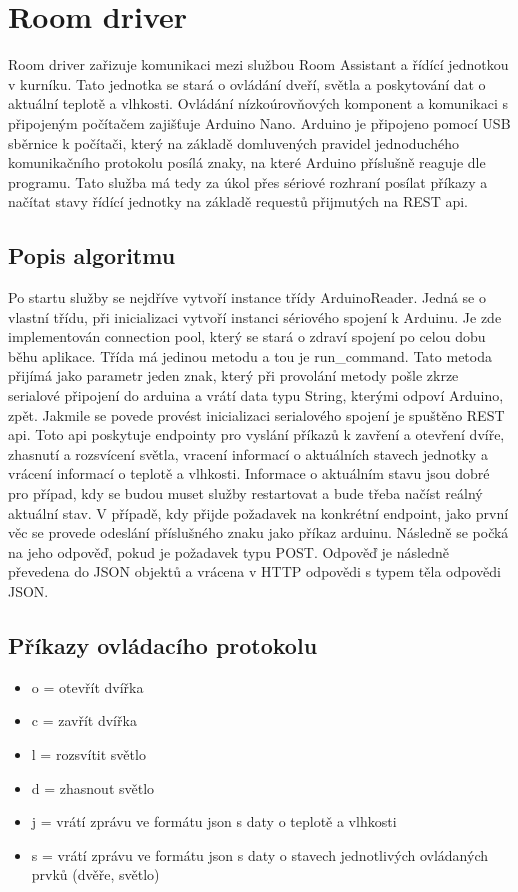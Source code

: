 \section{Room driver}\label{sec:room-driver}
Room driver zařizuje komunikaci mezi službou Room Assistant a řídící jednotkou v kurníku.
Tato jednotka se stará o ovládání dveří, světla a poskytování dat o aktuální teplotě a vlhkosti.
Ovládání nízkoúrovňových komponent a komunikaci s připojeným počítačem zajišťuje Arduino Nano.
Arduino je připojeno pomocí USB sběrnice k počítači, který na základě domluvených pravidel jednoduchého komunikačního protokolu posílá znaky, na které Arduino příslušně reaguje dle programu.
Tato služba má tedy za úkol přes sériové rozhraní posílat příkazy a načítat stavy řídící jednotky na základě requestů přijmutých na REST api.

\subsection*{Popis algoritmu}
Po startu služby se nejdříve vytvoří instance třídy ArduinoReader.
Jedná se o vlastní třídu, při inicializaci vytvoří instanci sériového spojení k Arduinu.
Je zde implementován connection pool, který se stará o zdraví spojení po celou dobu běhu aplikace.
Třída má jedinou metodu a tou je run\_command.
Tato metoda přijímá jako parametr jeden znak, který při provolání metody pošle zkrze serialové připojení do arduina a vrátí data typu String, kterými odpoví Arduino, zpět.
Jakmile se povede provést inicializaci serialového spojení je spuštěno REST api.
Toto api poskytuje endpointy pro vyslání příkazů k zavření a otevření dvíře, zhasnutí a rozsvícení světla, vracení informací o aktuálních stavech jednotky a vrácení informací o teplotě a vlhkosti.
Informace o aktuálním stavu jsou dobré pro případ, kdy se budou muset služby restartovat a bude třeba načíst reálný aktuální stav.
V případě, kdy přijde požadavek na konkrétní endpoint, jako první věc se provede odeslání příslušného znaku jako příkaz arduinu.
Následně se počká na jeho odpověď, pokud je požadavek typu POST.
Odpověď je následně převedena do JSON objektů a vrácena v HTTP odpovědi s typem těla odpovědi JSON.

\subsection*{Příkazy ovládacího protokolu}
\begin{itemize}
    \item o = otevřít dvířka
    \item c = zavřít dvířka
    \item l = rozsvítit světlo
    \item d = zhasnout světlo
    \item j = vrátí zprávu ve formátu json s daty o teplotě a vlhkosti
    \item s = vrátí zprávu ve formátu json s daty o stavech jednotlivých ovládaných prvků (dvěře, světlo)
\end{itemize}


